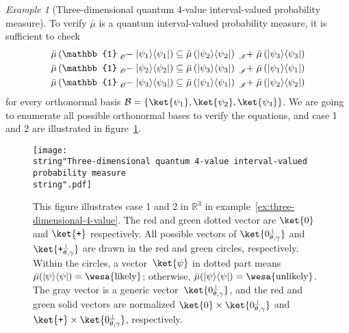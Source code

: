 \documentclass{article}
\theoremstyle{remark}
\newtheorem{example}{Example}
\newcommand{\ps}{\texttt{+}}
\newcommand{\likely}{{\mbox{\wesa{likely}}}}
\newcommand{\unlikely}{{\mbox{\wesa{unlikely}}}}
\newcommand{\op}[2]{\ensuremath{\left\vert{#1}\middle\rangle\middle\langle{#2}\right\vert}}
\newcommand{\proj}[1]{\op{#1}{#1}}
\begin{document}
\begin{example}[Three-dimensional quantum 4-value interval-valued
probability measure]
To verify $\bar{\mu}$ is a quantum interval-valued probability measure,
it is sufficient to check 
\begin{equation}
\begin{aligned}\bar{\mu}\left(\mathbb{1}\tensor*[_{\mathscr{O}}]{-}{}\proj{\psi_{1}}\right) & \subseteq\bar{\mu}\left(\proj{\psi_{2}}\right)\tensor*[_{\mathscr{I}}]{+}{}\bar{\mu}\left(\proj{\psi_{3}}\right)\\
\bar{\mu}\left(\mathbb{1}\tensor*[_{\mathscr{O}}]{-}{}\proj{\psi_{2}}\right) & \subseteq\bar{\mu}\left(\proj{\psi_{3}}\right)\tensor*[_{\mathscr{I}}]{+}{}\bar{\mu}\left(\proj{\psi_{1}}\right)\\
\bar{\mu}\left(\mathbb{1}\tensor*[_{\mathscr{O}}]{-}{}\proj{\psi_{3}}\right) & \subseteq\bar{\mu}\left(\proj{\psi_{1}}\right)\tensor*[_{\mathscr{I}}]{+}{}\bar{\mu}\left(\proj{\psi_{2}}\right)
\end{aligned}
\label{eq:non-additive-vectors}
\end{equation}
for every orthonormal basis $\mathcal{B}=\left\{ \ket{\psi_{1}},\ket{\psi_{2}},\ket{\psi_{3}}\right\} $.
We are going to enumerate all possible orthonormal bases to verify
the equations, and case 1 and 2 are illustrated in figure~\ref{fig:three-dimensional-4-value}.
\begin{figure}
\texttt{[image: \\string"Three-dimensional quantum 4-value interval-valued probability measure\\string".pdf]}\caption{\label{fig:three-dimensional-4-value}This figure illustrates case
1 and 2 in $\mathbb{R}^{3}$ in example~\ref{ex:three-dimensional-4-value}.
The red and green dotted vector are $\ket{0}$ and $\ket{\ps}$ respectively.
All possible vectors of $\ket{0_{\theta,\gamma}^{\perp}}$ and $\ket{\ps_{\theta,\gamma}^{\perp}}$
are drawn in the red and green circles, respectively. Within the circles,
a vector~$\ket{\psi}$ in dotted part means $\bar{\mu}(\proj{\psi})=\likely$;
otherwise, $\bar{\mu}(\proj{\psi})=\unlikely$. The gray vector is
a generic vector~$\ket{0_{\theta,\gamma}^{\perp}}$, and the red
and green solid vectors are normalized $\ket{0}\times\ket{0_{\theta,\gamma}^{\perp}}$
and $\ket{\ps}\times\ket{0_{\theta,\gamma}^{\perp}}$, respectively.}
\end{figure}


\end{example}
\end{document}
